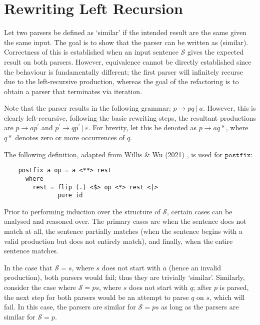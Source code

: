 \section{Rewriting Left Recursion}
\label{sec:sound_rewrite}

Let two parsers be defined as `similar' if the intended result are the same given the same input.
The goal is to show that the parser  can be written as  (similar).
Correctness of this is established when an input sentence $\mathcal{S}$ gives the expected result on both parsers.
However, equivalence cannot be directly established since the behaviour is fundamentally different; the first parser will infinitely recurse due to the left-recursive production, whereas the goal of the refactoring is to obtain a parser that terminates via iteration.

Note that the parser results in the following grammar; $p \to pq\ |\ a$.
However, this is clearly left-recursive, following the basic rewriting steps, the resultant productions are $p \to ap^\prime$ and $p^\prime \to qp^\prime\ |\ \varepsilon$.
For brevity, let this be denoted as $p \to aq*$, where $q*$ denotes zero or more occurrences of $q$.
\bigskip

The following definition, adapted from Willis \& Wu (2021) \cite{willis21}, is used for $\texttt{postfix}$:

\begin{verbatim}
    postfix a op = a <**> rest
      where
        rest = flip (.) <$> op <*> rest <|>
               pure id
\end{verbatim}

Prior to performing induction over the structure of $\mathcal{S}$, certain cases can be analysed and reasoned over.
The primary cases are when the sentence does not match at all, the sentence partially matches (when the sentence begins with a valid production but does not entirely match), and finally, when the entire sentence matches.

In the case that $\mathcal{S} = s$, where $s$ does not start with $a$ (hence an invalid production), both parsers would fail; thus they are trivially `similar'.
Similarly, consider the case where $\mathcal{S} = ps$, where $s$ does not start with $q$; after $p$ is parsed, the next step for both parsers would be an attempt to parse $q$ on $s$, which will fail.
In this case, the parsers are similar for $\mathcal{S} = ps$ as long as the parsers are similar for $\mathcal{S} = p$.

